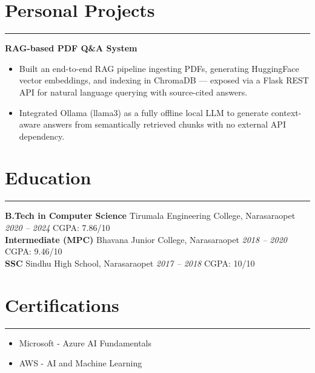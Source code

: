 \documentclass[10pt]{article}
\begin{document}
\section*{Personal Projects}
\vspace{1pt}\hrule\vspace{4pt}
\textbf{RAG-based PDF Q\&A System}
\begin{itemize}
  \item Built an end-to-end RAG pipeline ingesting PDFs, generating HuggingFace vector embeddings, and indexing in ChromaDB — exposed via a Flask REST API for natural language querying with source-cited answers.
  \item Integrated Ollama (llama3) as a fully offline local LLM to generate context-aware answers from semantically retrieved chunks with no external API dependency.
\end{itemize}

\section*{Education}
\vspace{1pt}\hrule\vspace{4pt}
\textbf{B.Tech in Computer Science} \textbullet{} Tirumala Engineering College, Narasaraopet \hfill \textit{2020 -- 2024} \quad CGPA: 7.86/10 \\[1pt]
\textbf{Intermediate (MPC)} \textbullet{} Bhavana Junior College, Narasaraopet \hfill \textit{2018 -- 2020} \quad CGPA: 9.46/10 \\[1pt]
\textbf{SSC} \textbullet{} Sindhu High School, Narasaraopet \hfill \textit{2017 -- 2018} \quad CGPA: 10/10

\section*{Certifications}
\vspace{1pt}\hrule\vspace{4pt}
\begin{itemize}
  \item Microsoft - Azure AI Fundamentals
  \item AWS - AI and Machine Learning
\end{itemize}
\end{document}
